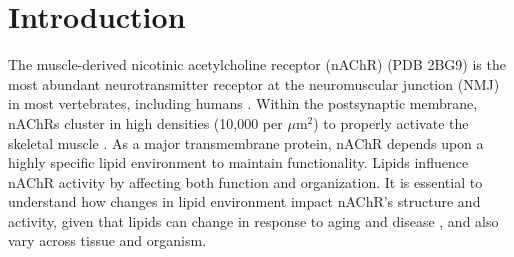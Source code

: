 \section{Introduction}
\label{intro}
The muscle-derived nicotinic acetylcholine receptor (nAChR) (PDB 2BG9) \citep{Unwin2005} is the most abundant neurotransmitter receptor at the neuromuscular junction (NMJ) in most vertebrates, including humans \citep{Albuquerque2009}. Within the postsynaptic membrane, nAChRs cluster in high densities (10,000 per $\mu$m$^{2}$) to properly activate the skeletal muscle \citep{Ramarao1998,Breckenridge1972}. As a major transmembrane protein, nAChR depends upon a highly specific lipid environment to maintain functionality. Lipids influence nAChR activity by affecting both function and organization. It is essential to understand how changes in lipid environment impact nAChR's structure and activity, given that lipids can change in response to aging and disease  \citep{Yadav2014}, and also vary across tissue and organism. 



